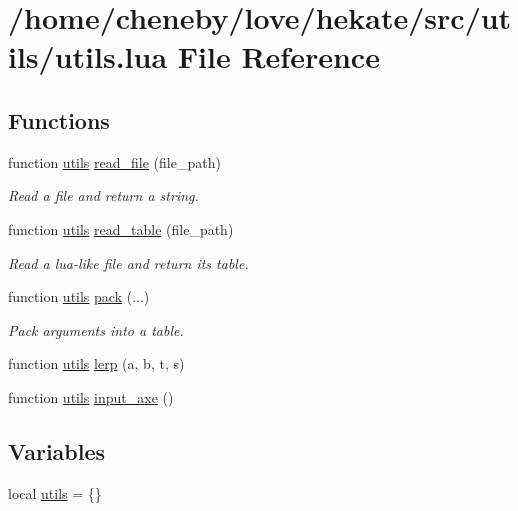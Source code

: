 \hypertarget{utils_8lua}{\section{/home/cheneby/love/hekate/src/utils/utils.lua File Reference}
\label{utils_8lua}
}
\subsection*{Functions}
\begin{DoxyCompactItemize}
\item 
function \hyperlink{world_8lua_a9b2ba82def3d3656dc370bac0a641700}{utils} \hyperlink{utils_8lua_ab0033507d9038abe2c631a3c90914152}{read\-\_\-file} (file\-\_\-path)
\begin{DoxyCompactList}\small\item\em Read a file and return a string. \end{DoxyCompactList}\item 
function \hyperlink{world_8lua_a9b2ba82def3d3656dc370bac0a641700}{utils} \hyperlink{utils_8lua_a4b78244cf4efe323c2cc510f137afc7b}{read\-\_\-table} (file\-\_\-path)
\begin{DoxyCompactList}\small\item\em Read a lua-\/like file and return its table. \end{DoxyCompactList}\item 
function \hyperlink{world_8lua_a9b2ba82def3d3656dc370bac0a641700}{utils} \hyperlink{utils_8lua_a442b7ac065d5d8e94bcc1e61160958dc}{pack} (...)
\begin{DoxyCompactList}\small\item\em Pack arguments into a table. \end{DoxyCompactList}\item 
function \hyperlink{world_8lua_a9b2ba82def3d3656dc370bac0a641700}{utils} \hyperlink{utils_8lua_a20af1082cf27864a3afe660a4ca3d9fb}{lerp} (a, b, t, s)
\item 
function \hyperlink{world_8lua_a9b2ba82def3d3656dc370bac0a641700}{utils} \hyperlink{utils_8lua_a9395c36deff86ef8e857044d0626006f}{input\-\_\-axe} ()
\end{DoxyCompactItemize}
\subsection*{Variables}
\begin{DoxyCompactItemize}
\item 
local \hyperlink{utils_8lua_a9b2ba82def3d3656dc370bac0a641700}{utils} = \{\}
\end{DoxyCompactItemize}


